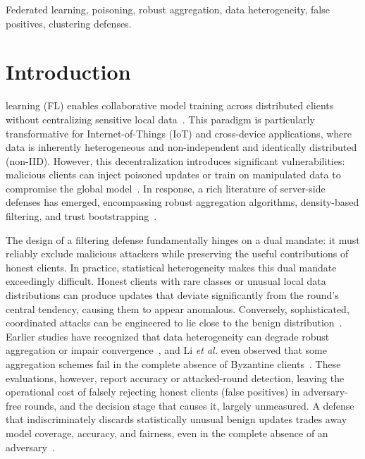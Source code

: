 \documentclass[journal]{IEEEtran}
\begin{document}
\begin{IEEEkeywords}
Federated learning, poisoning, robust aggregation, data heterogeneity, false positives, clustering defenses.
\end{IEEEkeywords}
\IEEEpeerreviewmaketitle

\section{Introduction}
 learning (FL) enables collaborative model training across distributed clients without centralizing sensitive local data~\cite{mcmahan2017}. This paradigm is particularly transformative for Internet-of-Things (IoT) and cross-device applications, where data is inherently heterogeneous and non-independent and identically distributed (non-IID). However, this decentralization introduces significant vulnerabilities: malicious clients can inject poisoned updates or train on manipulated data to compromise the global model~\cite{fang2020,bagdasaryan2020,xie2020dba}. In response, a rich literature of server-side defenses has emerged, encompassing robust aggregation algorithms, density-based filtering, and trust bootstrapping~\cite{blanchard2017,nguyen2022flame,cao2021fltrust,miao2022privacy}.

The design of a filtering defense fundamentally hinges on a dual mandate: it must reliably exclude malicious attackers while preserving the useful contributions of honest clients. In practice, statistical heterogeneity makes this dual mandate exceedingly difficult. Honest clients with rare classes or unusual local data distributions can produce updates that deviate significantly from the round's central tendency, causing them to appear anomalous. Conversely, sophisticated, coordinated attacks can be engineered to lie close to the benign distribution~\cite{baruch2019,shejwalkar2021}. Earlier studies have recognized that data heterogeneity can degrade robust aggregation or impair convergence~\cite{liu2023byzantine,li2025heterogeneity,ye2025illusion,bellachia2026sok}, and Li \emph{et al.} even observed that some aggregation schemes fail in the complete absence of Byzantine clients~\cite{li2024experimental}. These evaluations, however, report accuracy or attacked-round detection, leaving the operational cost of falsely rejecting honest clients (false positives) in adversary-free rounds, and the decision stage that causes it, largely unmeasured. A defense that indiscriminately discards statistically unusual benign updates trades away model coverage, accuracy, and fairness, even in the complete absence of an adversary~\cite{singh2023fair,touat2023bias,ajibuwa2025fairness}.
\end{document}
